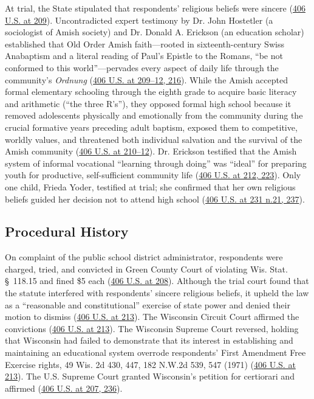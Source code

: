 \documentclass[12pt]{article}
\begin{document}
At trial, the State stipulated that respondents' religious beliefs were sincere (\href{https://supreme.justia.com/cases/federal/us/406/205/}{406 U.S. at 209}). Uncontradicted expert testimony by Dr. John Hostetler (a sociologist of Amish society) and Dr. Donald A. Erickson (an education scholar) established that Old Order Amish faith---rooted in sixteenth-century Swiss Anabaptism and a literal reading of Paul's Epistle to the Romans, ``be not conformed to this world''---pervades every aspect of daily life through the community's \emph{Ordnung} (\href{https://supreme.justia.com/cases/federal/us/406/205/}{406 U.S. at 209--12, 216}). While the Amish accepted formal elementary schooling through the eighth grade to acquire basic literacy and arithmetic (``the three R's''), they opposed formal high school because it removed adolescents physically and emotionally from the community during the crucial formative years preceding adult baptism, exposed them to competitive, worldly values, and threatened both individual salvation and the survival of the Amish community (\href{https://supreme.justia.com/cases/federal/us/406/205/}{406 U.S. at 210--12}). Dr. Erickson testified that the Amish system of informal vocational ``learning through doing'' was ``ideal'' for preparing youth for productive, self-sufficient community life (\href{https://supreme.justia.com/cases/federal/us/406/205/}{406 U.S. at 212, 223}). Only one child, Frieda Yoder, testified at trial; she confirmed that her own religious beliefs guided her decision not to attend high school (\href{https://supreme.justia.com/cases/federal/us/406/205/}{406 U.S. at 231 n.21, 237}).

\subsection{Procedural History}

On complaint of the public school district administrator, respondents were charged, tried, and convicted in Green County Court of violating Wis. Stat. \S~118.15 and fined \$5 each (\href{https://supreme.justia.com/cases/federal/us/406/205/}{406 U.S. at 208}). Although the trial court found that the statute interfered with respondents' sincere religious beliefs, it upheld the law as a ``reasonable and constitutional'' exercise of state power and denied their motion to dismiss (\href{https://supreme.justia.com/cases/federal/us/406/205/}{406 U.S. at 213}). The Wisconsin Circuit Court affirmed the convictions (\href{https://supreme.justia.com/cases/federal/us/406/205/}{406 U.S. at 213}). The Wisconsin Supreme Court reversed, holding that Wisconsin had failed to demonstrate that its interest in establishing and maintaining an educational system overrode respondents' First Amendment Free Exercise rights, 49 Wis. 2d 430, 447, 182 N.W.2d 539, 547 (1971) (\href{https://supreme.justia.com/cases/federal/us/406/205/}{406 U.S. at 213}). The U.S. Supreme Court granted Wisconsin's petition for certiorari and affirmed (\href{https://supreme.justia.com/cases/federal/us/406/205/}{406 U.S. at 207, 236}).
\end{document}
